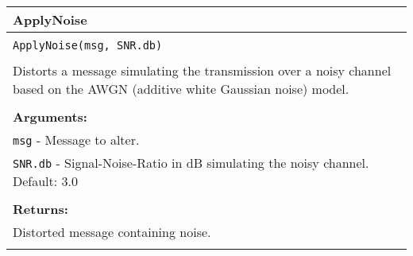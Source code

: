 \begin{longtable}{|p{\textwidth}|}
\hline
\rowcolor{lightblue}
ApplyNoise\\
\hline
\\
\texttt{ApplyNoise(msg, SNR.db)}\\
\\
Distorts a message simulating the transmission over a noisy channel based on the AWGN (additive white Gaussian noise) model.\\
\\
\textbf{Arguments:}\\
\texttt{msg} - Message to alter.\\
\texttt{SNR.db} - Signal-Noise-Ratio in dB simulating the noisy channel. Default: 3.0\\
\\
\textbf{Returns:}\\
Distorted message containing noise.\\
\\
\hline
\end{longtable}